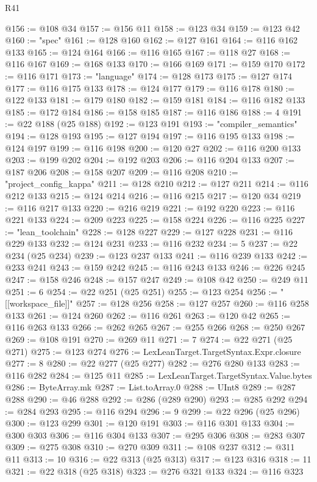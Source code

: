 \begin{lexlean}{R41}
\begin{coremodule}
@156 := @108 @34
@157 := @156 @11
@158 := @123 @34
@159 := @123 @42
@160 := "spec"
@161 := @128 @160
@162 := @127 @161
@164 := @116 @162 @133
@165 := @124 @164
@166 := @116 @165
@167 := @118 @27
@168 := @116 @167
@169 := @168 @133
@170 := @166 @169
@171 := @159 @170
@172 := @116 @171
@173 := "language"
@174 := @128 @173
@175 := @127 @174
@177 := @116 @175 @133
@178 := @124 @177
@179 := @116 @178
@180 := @122 @133
@181 := @179 @180
@182 := @159 @181
@184 := @116 @182 @133
@185 := @172 @184
@186 := @158 @185
@187 := @116 @186
@188 := 4
@191 := @22 @188 (@25 @188)
@192 := @123 @191
@193 := "compiler_semantics"
@194 := @128 @193
@195 := @127 @194
@197 := @116 @195 @133
@198 := @124 @197
@199 := @116 @198
@200 := @120 @27
@202 := @116 @200 @133
@203 := @199 @202
@204 := @192 @203
@206 := @116 @204 @133
@207 := @187 @206
@208 := @158 @207
@209 := @116 @208
@210 := "project_config_kappa"
@211 := @128 @210
@212 := @127 @211
@214 := @116 @212 @133
@215 := @124 @214
@216 := @116 @215
@217 := @120 @34
@219 := @116 @217 @133
@220 := @216 @219
@221 := @192 @220
@223 := @116 @221 @133
@224 := @209 @223
@225 := @158 @224
@226 := @116 @225
@227 := "lean_toolchain"
@228 := @128 @227
@229 := @127 @228
@231 := @116 @229 @133
@232 := @124 @231
@233 := @116 @232
@234 := 5
@237 := @22 @234 (@25 @234)
@239 := @123 @237 @133
@241 := @116 @239 @133
@242 := @233 @241
@243 := @159 @242
@245 := @116 @243 @133
@246 := @226 @245
@247 := @158 @246
@248 := @157 @247
@249 := @108 @42
@250 := @249 @11
@251 := 6
@254 := @22 @251 (@25 @251)
@255 := @123 @254
@256 := "[[workspace_file]]"
@257 := @128 @256
@258 := @127 @257
@260 := @116 @258 @133
@261 := @124 @260
@262 := @116 @261
@263 := @120 @42
@265 := @116 @263 @133
@266 := @262 @265
@267 := @255 @266
@268 := @250 @267
@269 := @108 @191
@270 := @269 @11
@271 := 7
@274 := @22 @271 (@25 @271)
@275 := @123 @274
@276 := LexLeanTarget.TargetSyntax.Expr.closure
@277 := 8
@280 := @22 @277 (@25 @277)
@282 := @276 @280 @133
@283 := @116 @282
@284 := @125 @11
@285 := LexLeanTarget.TargetSyntax.Value.bytes
@286 := ByteArray.mk
@287 := List.toArray.{0}
@288 := UInt8
@289 := @287 @288
@290 := @46 @288
@292 := @286 (@289 @290)
@293 := @285 @292
@294 := @284 @293
@295 := @116 @294
@296 := 9
@299 := @22 @296 (@25 @296)
@300 := @123 @299
@301 := @120 @191
@303 := @116 @301 @133
@304 := @300 @303
@306 := @116 @304 @133
@307 := @295 @306
@308 := @283 @307
@309 := @275 @308
@310 := @270 @309
@311 := @108 @237
@312 := @311 @11
@313 := 10
@316 := @22 @313 (@25 @313)
@317 := @123 @316
@318 := 11
@321 := @22 @318 (@25 @318)
@323 := @276 @321 @133
@324 := @116 @323

\end{coremodule}
\end{lexlean}
